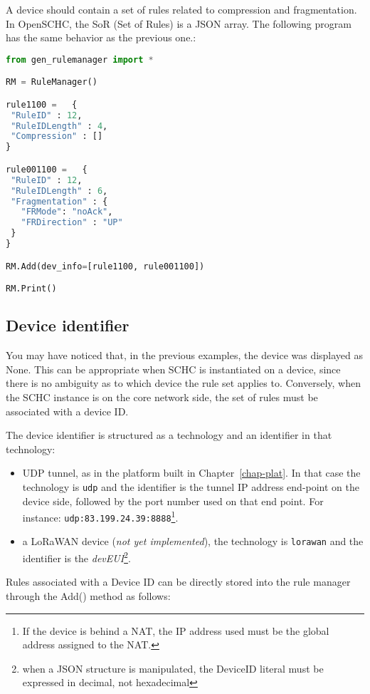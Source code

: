 \documentclass[onecolumn,12pt]{book}
\newcounter{c}
\begin{document}
A device should contain a set of rules related to compression and fragmentation. In OpenSCHC, the SoR (Set of Rules) is a JSON array. The following program has the same behavior as the previous one.:

\begin{lstlisting}[language=Python]
from gen_rulemanager import *

RM = RuleManager()

rule1100 =   {
 "RuleID" : 12,
 "RuleIDLength" : 4,
 "Compression" : []
}

rule001100 =   {
 "RuleID" : 12,
 "RuleIDLength" : 6,
 "Fragmentation" : {
   "FRMode": "noAck",
   "FRDirection" : "UP"
 }
}

RM.Add(dev_info=[rule1100, rule001100])

RM.Print()
\end{lstlisting}

\subsection{Device identifier}

You may have noticed that, in the previous examples, the device was displayed as None. This can be appropriate when SCHC is instantiated on a device, since there is no ambiguity as to which device the rule set applies to. Conversely, when the SCHC instance is on the core network side, the set of rules must be associated with a device ID.

The device identifier is structured as a technology and an identifier in that technology:
\begin{itemize}
\item UDP tunnel, as in the platform built in Chapter~\vref{chap-plat}. In that case the technology is \texttt{udp} and the identifier is the tunnel IP address end-point on the device side, followed by the port number used on that end point. For instance: \texttt{udp:83.199.24.39:8888}\footnote{If the device is behind a NAT, the IP address used must be the global address assigned to the NAT.}. 
\item a LoRaWAN device (\textit{not yet implemented}), the technology is \texttt{lorawan} and the identifier is the \textit{devEUI}\footnote{when a JSON structure is manipulated, the DeviceID literal must be expressed in decimal, not hexadecimal}.

\end{itemize}

Rules associated with a Device ID can be directly stored into the rule manager through the Add() method as follows:
\end{document}

